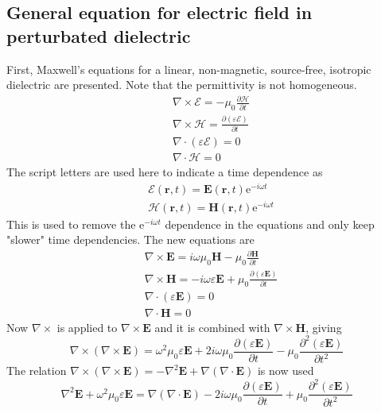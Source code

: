 \documentclass[11pt,twoside]{eitExjobb}
\begin{document}
	\subsection{General equation for electric field in perturbated dielectric}
	First, Maxwell's equations for a linear, non-magnetic, source-free, isotropic dielectric are presented. Note that the permittivity is not homogeneous.
	\begin{align*}
		&\nabla \times \bm{\mathcal{E}} = -\mu_0 \frac{\partial \bm{\mathcal{H}}}{\partial t} \\
		&\nabla \times \bm{\mathcal{H}} = \frac{\partial (\varepsilon \bm{\mathcal{E}})}{\partial t} \\
		&\nabla \cdot (\varepsilon \bm{\mathcal{E}}) = 0 \\
		&\nabla \cdot \bm{\mathcal{H}} = 0
	\end{align*}
	The script letters are used here to indicate a time dependence as
	\begin{align*}
		&\bm{\mathcal{E}}(\bm{r},t) = \bm{E}(\bm{r},t) \text{e}^{-i\omega t} \\
		&\bm{\mathcal{H}}(\bm{r},t) = \bm{H}(\bm{r},t) \text{e}^{-i\omega t}
	\end{align*}
	This is used to remove the e$^{-i\omega t}$ dependence in the equations and only keep "slower" time dependencies. The new equations are
	\begin{align}
		&\nabla \times \bm{E} = i\omega \mu_0 \bm{H} - \mu_0 \frac{\partial \bm{H}}{\partial t} \label{eq:app-scatter-faraday} \\
		&\nabla \times \bm{H} = -i\omega \varepsilon \bm{E} + \mu_0 \frac{\partial (\varepsilon \bm{E})}{\partial t} \label{eq:app-scatter-ampere} \\
		&\nabla \cdot (\varepsilon \bm{E}) = 0 \label{eq:app-scatter-gauss} \\
		&\nabla \cdot \bm{H} = 0 \label{eq:app-scatter-magn}
	\end{align}
	Now $\nabla \times$ is applied to $\nabla \times \bm{E}$ and it is combined with $\nabla \times \bm{H}$, giving
	\begin{equation*}
		\nabla \times (\nabla \times \bm{E}) = \omega^2 \mu_0 \varepsilon \bm{E} + 2i\omega \mu_0 \frac{\partial (\varepsilon \bm{E})}{\partial t} - \mu_0 \frac{\partial^2 (\varepsilon \bm{E})}{\partial t^2}
	\end{equation*}
	The relation $\nabla \times (\nabla \times \bm{E}) = -\nabla^2\bm{E} + \nabla(\nabla \cdot \bm{E})$ is now used
	\begin{equation}
		\nabla^2\bm{E} + \omega^2 \mu_0 \varepsilon \bm{E} = \nabla(\nabla \cdot \bm{E}) - 2i\omega \mu_0 \frac{\partial (\varepsilon \bm{E})}{\partial t} + \mu_0 \frac{\partial^2 (\varepsilon \bm{E})}{\partial t^2}
		\label{eq:app-scatter-Efield1}
	\end{equation}
\end{document}
